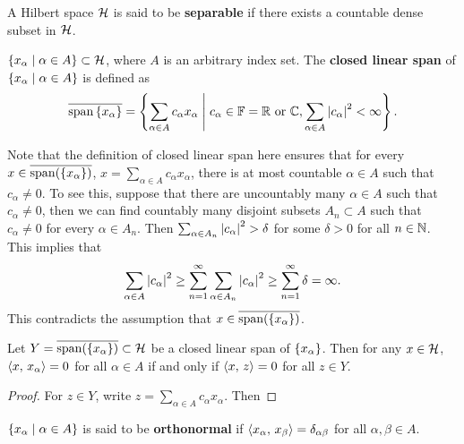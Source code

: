 \begin{definition}
    A Hilbert space $\mathcal{H}$ is said to be \textbf{separable} if there 
    exists a countable dense subset in $\mathcal{H}$.
\end{definition}

\begin{definition}
    $\left\{ x_\alpha \;\middle\vert\; \alpha\in A \right\}\subset\mathcal{H}$, where $A$ is an arbitrary 
    index set. The \textbf{closed linear span} of 
    $\left\{ x_\alpha \;\middle\vert\; \alpha\in A \right\}$ is defined as 
    \begin{equation*}
        \overline{\operatorname{span}\left\{ {x_\alpha} \right\}} 
        = \left\{ \sum_{\alpha\in A}c_\alpha x_\alpha \;\middle\vert\; c_\alpha\in\mathbb{F} = \mathbb{R} \text{ or } \mathbb{C}, \sum_{\alpha\in A}\left\lvert {c_\alpha} \right\rvert^2 < \infty \right\}.
    \end{equation*}
\end{definition}
\begin{remark}
    Note that the definition of closed linear span here ensures that 
    for every $x\in\overline{\operatorname{span}(\left\{ {x_\alpha} \right\})}$, 
    $x = \sum_{\alpha\in A} c_\alpha x_\alpha$, there is at most 
    countable $\alpha\in A$ such that $c_\alpha\neq 0$. To see 
    this, suppose that there are uncountably many $\alpha\in A$ 
    such that $c_\alpha\neq 0$, then we can find countably many 
    disjoint subsets $A_n\subset A$ such that $c_\alpha\neq 0$ for 
    every $\alpha\in A_n$. Then $\sum_{\alpha\in A_n} \left\lvert {c_\alpha} \right\rvert^2>\delta$ 
    for some $\delta>0$ for all $n\in\mathbb{N}$. This implies that 
    \begin{equation*}
        \sum_{\alpha\in A}\left\lvert {c_\alpha} \right\rvert^2 \geq \sum_{n=1}^\infty\sum_{\alpha\in A_n}\left\lvert {c_\alpha} \right\rvert^2 
        \geq \sum_{n=1}^\infty\delta = \infty.
    \end{equation*}
    This contradicts the assumption that $x\in\overline{\operatorname{span}(\left\{ {x_\alpha} \right\})}$.
\end{remark}

\begin{proposition}
    Let $Y = \overline{\operatorname{span}(\left\{ {x_\alpha} \right\})}\subset\mathcal{H}$ be a 
    closed linear span of $\left\{ {x_\alpha} \right\}$. Then for any $x\in\mathcal{H}$, 
    $\left\langle {x},\, {x_\alpha} \right\rangle = 0$ for all $\alpha\in A$ if and only if 
    $\left\langle {x},\, {z} \right\rangle = 0$ for all $z\in Y$.
\end{proposition}
\begin{proof}
    For $z\in Y$, write $z = \sum_{\alpha\in A}c_\alpha x_\alpha$. 
    Then
\end{proof}

\begin{definition}
    $\left\{ x_\alpha \;\middle\vert\; \alpha\in A \right\}$ is said to be \textbf{orthonormal} 
    if $\left\langle {x_\alpha},\, {x_\beta} \right\rangle = \delta_{\alpha\beta}$ for all 
    $\alpha,\beta\in A$.
\end{definition}

